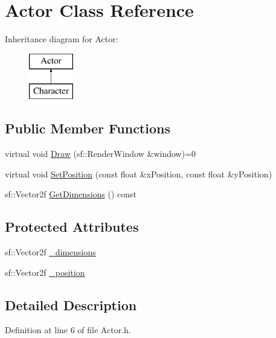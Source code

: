 \hypertarget{class_actor}{}\section{Actor Class Reference}
\label{class_actor}
Inheritance diagram for Actor\+:\begin{figure}[H]
\begin{center}
\leavevmode
\includegraphics[height=2.000000cm]{class_actor}
\end{center}
\end{figure}
\subsection*{Public Member Functions}
\begin{DoxyCompactItemize}
\item 
virtual void \hyperlink{class_actor_ad5c98db519558b3b22c03acec73b8869}{Draw} (sf\+::\+Render\+Window \&window)=0
\item 
virtual void \hyperlink{class_actor_a41012afefccde8234e574b03d9fdbc08}{Set\+Position} (const float \&x\+Position, const float \&y\+Position)
\item 
sf\+::\+Vector2f \hyperlink{class_actor_a2f63a8afe2d15b4ba695b2d4e4c8597e}{Get\+Dimensions} () const 
\end{DoxyCompactItemize}
\subsection*{Protected Attributes}
\begin{DoxyCompactItemize}
\item 
sf\+::\+Vector2f \hyperlink{class_actor_acfabf742ec617868223278c3b8f91336}{\+\_\+dimensions}
\item 
sf\+::\+Vector2f \hyperlink{class_actor_ad3760883a99be5b4aaa2635ca761c29b}{\+\_\+position}
\end{DoxyCompactItemize}


\subsection{Detailed Description}


Definition at line 6 of file Actor.\+h.



